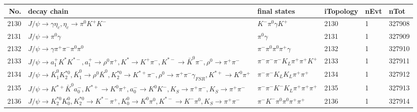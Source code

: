 \begin{table}[htbp] 
\begin{center}
\begin{small}
\begin{tabular}{rlllll}\hline\hline
 No. & decay chain & final states &  iTopology & nEvt & nTot \\\hline
2130&$J/\psi       \rightarrow \gamma       \eta_{c}    , \eta_{c}     \rightarrow \pi^{0}        K^{+}          K^{-}          $&$K^{-}          \pi^{0}        \gamma       K^{+}          $& 2130&    1&327908\\
2131&$J/\psi       \rightarrow \pi^{0}        \gamma       $&$\pi^{0}        \gamma       $& 2131&    1&327909\\
2132&$J/\psi       \rightarrow \gamma       \pi^{+}        \pi^{-}        \pi^{0}        \pi^{0}        $&$\pi^{-}        \pi^{0}        \pi^{0}        \pi^{+}        \gamma       $& 2132&    1&327910\\
2133&$J/\psi       \rightarrow a_{1}^{+}      K^{*}          K^{*-}         , a_{1}^{+}       \rightarrow \rho^{0}      \pi^{+}        , K^{*}           \rightarrow K^{+}          \pi^{-}        , K^{*-}          \rightarrow \bar{K}^{0}   \pi^{-}        , \rho^{0}       \rightarrow \pi^{+}        \pi^{-}        $&$\pi^{-}        \pi^{-}        \pi^{-}        K_{L}          \pi^{+}        \pi^{+}        K^{+}          $& 2133&    1&327911\\
2134&$J/\psi       \rightarrow \bar{K}_1^{0} K_2^{*0}       , \bar{K}_1^{0}  \rightarrow \rho^{0}      \bar{K}^{0}   , K_2^{*0}        \rightarrow K^{*+}         \pi^{-}        , \rho^{0}       \rightarrow \pi^{+}        \pi^{-}        \gamma_{FSR} , K^{*+}          \rightarrow K^{0}          \pi^{+}        $&$\pi^{-}        \pi^{-}        K_{L}          K_{L}          \pi^{+}        \pi^{+}        $& 2134&    1&327912\\
2135&$J/\psi       \rightarrow K^{*+}         \bar{K}^{0}   a_{0}^{-}      , K^{*+}          \rightarrow K^{0}          \pi^{+}        , a_{0}^{-}       \rightarrow K^{0}          K^{-}          , K_{S}           \rightarrow \pi^{+}        \pi^{-}        , K_{S}           \rightarrow \pi^{+}        \pi^{-}        $&$\pi^{-}        \pi^{-}        K^{-}          K_{L}          \pi^{+}        \pi^{+}        \pi^{+}        $& 2135&    1&327913\\
2136&$J/\psi       \rightarrow K_2^{*0}       K_0^{0}        , K_2^{*0}        \rightarrow K^{*-}         \pi^{+}        , K_0^{0}         \rightarrow K^{0}          \pi^{0}        , K^{*-}          \rightarrow K^{-}          \pi^{0}        , K_{S}           \rightarrow \pi^{+}        \pi^{-}        $&$\pi^{-}        K^{-}          \pi^{0}        \pi^{0}        \pi^{+}        \pi^{+}        $& 2136&    1&327914\\

\end{tabular}
\end{small}
\end{center}
\end{table}
